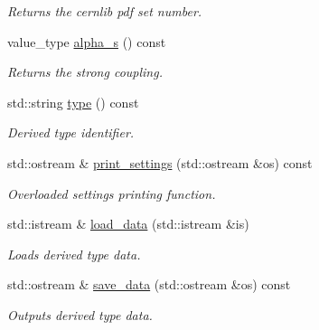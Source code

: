 \begin{DoxyCompactItemize}
\begin{DoxyCompactList}\small\item\em Returns the cernlib pdf set number. \end{DoxyCompactList}\item 
\hypertarget{a00259_a0e13cd819cced05ee42aecc180eb9810}{value\-\_\-type \hyperlink{a00259_a0e13cd819cced05ee42aecc180eb9810}{alpha\-\_\-s} () const }\label{a00259_a0e13cd819cced05ee42aecc180eb9810}

\begin{DoxyCompactList}\small\item\em Returns the strong coupling. \end{DoxyCompactList}\item 
\hypertarget{a00259_a075bf98d67ec3f3e40bebf59146b8314}{std\-::string \hyperlink{a00259_a075bf98d67ec3f3e40bebf59146b8314}{type} () const }\label{a00259_a075bf98d67ec3f3e40bebf59146b8314}

\begin{DoxyCompactList}\small\item\em Derived type identifier. \end{DoxyCompactList}\item 
\hypertarget{a00259_a73cbd67361be2a672e6ff091a0c366e0}{std\-::ostream \& \hyperlink{a00259_a73cbd67361be2a672e6ff091a0c366e0}{print\-\_\-settings} (std\-::ostream \&os) const }\label{a00259_a73cbd67361be2a672e6ff091a0c366e0}

\begin{DoxyCompactList}\small\item\em Overloaded settings printing function. \end{DoxyCompactList}\item 
\hypertarget{a00259_a0d13e5c8303f84ee6e668adb50285020}{std\-::istream \& \hyperlink{a00259_a0d13e5c8303f84ee6e668adb50285020}{load\-\_\-data} (std\-::istream \&is)}\label{a00259_a0d13e5c8303f84ee6e668adb50285020}

\begin{DoxyCompactList}\small\item\em Loads derived type data. \end{DoxyCompactList}\item 
\hypertarget{a00259_a398feb899672560c1a2a67024ad835ac}{std\-::ostream \& \hyperlink{a00259_a398feb899672560c1a2a67024ad835ac}{save\-\_\-data} (std\-::ostream \&os) const }\label{a00259_a398feb899672560c1a2a67024ad835ac}

\begin{DoxyCompactList}\small\item\em Outputs derived type data. \end{DoxyCompactList}\end{DoxyCompactItemize}
